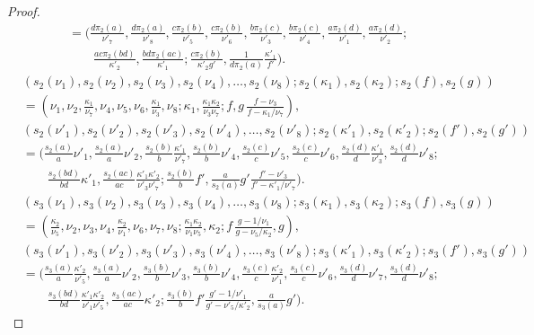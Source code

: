 \documentclass[12pt]{amsart}
\numberwithin{equation}{section}
\theoremstyle{definition}
\begin{document}
\begin{proof}
\begin{align}
  & = ( \frac{d \pi _2 (a) }{\nu '_7}, \frac{d \pi _2 (a) }{\nu '_8}, \frac{c \pi _2 (b) }{\nu '_5}, \frac{c \pi _2 (b) }{\nu '_6}, \frac{b \pi _2 (c) }{\nu '_3}, \frac{b \pi _2 (c) }{\nu '_4}, \frac{a \pi _2 (d) }{\nu '_1}, \frac{a \pi _2 (d) }{\nu '_2}; \nonumber \\
  &  \qquad \frac{ac \pi _2 (bd) }{\kappa '_2}, \frac{bd \pi _2 (ac) }{\kappa '_1}; \frac{c \pi _2 (b) }{\kappa '_2 g'},\frac{1}{ d \pi _2 (a)} \frac{\kappa '_1}{f'} ) . \nonumber
\end{align}
\begin{align}
  & ( s _2 (\nu_1), s _2 (\nu_2), s _2 (\nu_3), s _2 (\nu_4),  \dots ,  s _2 (\nu_8); s _2 (\kappa_1), s _2 (\kappa_2); s _2 (f), s _2 (g) )\\
  & = (\nu_1 , \nu_2 , \frac{\kappa_1}{\nu_7} , \nu_4 ,\nu_5 ,\nu_6 , \frac{\kappa_1}{\nu_3} ,\nu_8 ;\kappa_1 ,\frac{\kappa_1\kappa_2}{\nu_3\nu_7} ; f ,g\, \frac{f - \nu_3}{f - \kappa_1 /\nu_7} ) , \nonumber \\
  & ( s _2 (\nu'_1), s _2 (\nu'_2), s _2 (\nu'_3), s _2 (\nu'_4),  \dots ,  s _2 (\nu'_8); s _2 (\kappa'_1), s _2 (\kappa'_2); s _2 (f'), s _2 (g') ) \nonumber \\
  & = ( \frac{s _2 (a)}{a} \nu '_1 , \frac{s _2 (a)}{a} \nu '_2 , \frac{s _2 (b)}{b} \frac{\kappa '_1}{\nu '_7} , \frac{s _2 (b)}{b} \nu '_4 , \frac{s _2 (c)}{c} \nu '_5 , \frac{s _2 (c)}{c} \nu '_6 , \frac{s _2 (d)}{d} \frac{\kappa '_1}{\nu '_3} , \frac{s _2 (d)}{d} \nu '_8 ; \nonumber \\
  &  \qquad \frac{s _2 (bd)}{bd} \kappa '_1 , \frac{s _2 (ac)}{ac} \frac{\kappa '_1\kappa '_2}{\nu '_3\nu '_7} ; \frac{s _2 (b)}{b} f' , \frac{a}{s _2 (a)} g' \frac{f' - \nu '_3}{f' - \kappa '_1 /\nu '_7} ) . \nonumber 
\end{align}
\begin{align}
  & ( s _3 (\nu_1), s _3 (\nu_2), s _3 (\nu_3), s _3 (\nu_4),  \dots ,  s _3 (\nu_8); s _3 (\kappa_1), s _3 (\kappa_2); s _3 (f), s _3 (g) )\\
  & = (\frac{\kappa_2}{\nu_5} , \nu_2 , \nu_3 , \nu_4 , \frac{\kappa_2}{\nu_1} ,\nu_6 , \nu_7 ,\nu_8 ;\frac{\kappa_1\kappa_2}{\nu_1\nu_5} ,\kappa_2 ; f\, \frac{g - 1/\nu_1}{g - \nu_5/\kappa_2} ,g ) , \nonumber \\ 
  & ( s _3 (\nu'_1), s _3 (\nu'_2), s _3 (\nu'_3), s _3 (\nu'_4),  \dots ,  s _3 (\nu'_8); s _3 (\kappa'_1), s _3 (\kappa'_2); s _3 (f'), s _3 (g') ) \nonumber \\
  & = ( \frac{s _3 (a)}{a} \frac{\kappa '_2}{\nu '_5 }, \frac{s _3 (a)}{a} \nu '_2 , \frac{s _3 (b)}{b} \nu '_3 , \frac{s _3 (b)}{b} \nu '_4 , \frac{s _3 (c)}{c} \frac{\kappa '_2}{\nu '_1} , \frac{s _3 (c)}{c} \nu '_6 , \frac{s _3 (d)}{d} \nu '_7 , \frac{s _3 (d)}{d} \nu '_8 ; \nonumber \\
  &  \qquad \frac{s _3 (bd)}{bd} \frac{\kappa '_1\kappa '_2}{\nu '_1\nu '_5} , \frac{s _3 (ac)}{ac} \kappa '_2 ; \frac{s _3 (b)}{b} f' \frac{g' - 1/\nu '_1}{g' - \nu '_5/\kappa '_2} , \frac{a}{s _3 (a)} g' ) . \nonumber 
\end{align}
\end{proof}
\end{document}
